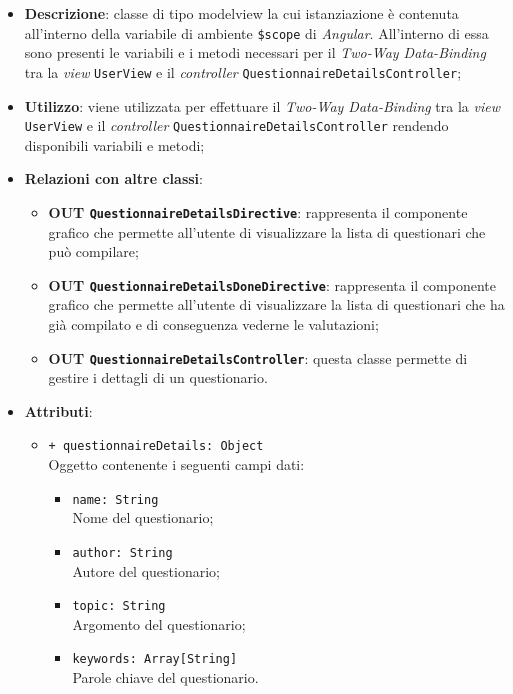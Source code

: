 	\begin{itemize}
		\item \textbf{Descrizione}: classe di tipo modelview la cui istanziazione è contenuta all'interno della variabile di ambiente \texttt{\$scope} di \textit{Angular}. All'interno di essa sono presenti le variabili e i metodi necessari per il \textit{Two-Way Data-Binding} tra la \textit{view} \texttt{UserView} e il \textit{controller} \texttt{QuestionnaireDetailsController};
		\item \textbf{Utilizzo}: viene utilizzata per effettuare il \textit{Two-Way Data-Binding} tra la \textit{view} \texttt{UserView} e il \textit{controller} \texttt{QuestionnaireDetailsController} rendendo disponibili variabili e metodi;
		\item \textbf{Relazioni con altre classi}: 
		\begin{itemize}
			\item \textbf{OUT \texttt{QuestionnaireDetailsDirective}}: rappresenta il componente grafico che permette all'utente di visualizzare la lista di questionari che può compilare;
			\item \textbf{OUT \texttt{QuestionnaireDetailsDoneDirective}}: rappresenta il componente grafico che permette all'utente di visualizzare la lista di questionari che ha già compilato e di conseguenza vederne le valutazioni;
			\item \textbf{OUT \texttt{QuestionnaireDetailsController}}: questa classe permette di gestire i dettagli di un questionario.
		\end{itemize}
		\item \textbf{Attributi}: 
		\begin{itemize}
			\item \texttt{+ questionnaireDetails: Object} \\ Oggetto contenente i seguenti campi dati:
			\begin{itemize}
				\item \texttt{name: String}\\ Nome del questionario;
				\item \texttt{author: String}\\ Autore del questionario;
				\item \texttt{topic: String}\\ Argomento del questionario;
				\item \texttt{keywords: Array[String]}\\ Parole chiave del questionario.
			\end{itemize}

\end{itemize}
\end{itemize}
